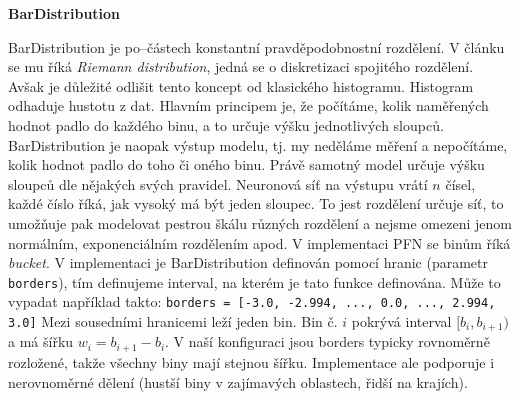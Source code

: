 \textbf{BarDistribution}

BarDistribution je po–částech konstantní pravděpodobnostní rozdělení.
V článku~\cite{muller2022} se mu říká \textit{Riemann distribution}, jedná se o diskretizaci spojitého rozdělení.
Avšak je důležité odlišit tento koncept od klasického histogramu.
Histogram odhaduje hustotu z dat.
Hlavním principem je, že počítáme, kolik naměřených hodnot padlo do každého binu, a to určuje výšku jednotlivých sloupců.
BarDistribution je naopak výstup modelu, tj. my neděláme měření a nepočítáme, kolik hodnot padlo do toho či oného binu.
Právě samotný model určuje výšku sloupců dle nějakých svých pravidel.
Neuronová síť na výstupu vrátí $n$ čísel, každé číslo říká, jak vysoký má být jeden sloupec. 
To jest rozdělení určuje síť, to umožňuje pak modelovat pestrou škálu různých rozdělení a nejsme omezeni jenom normálním, exponenciálním rozdělením apod.
V implementaci PFN se binům říká \textit{bucket}.
V implementaci je BarDistribution definován pomocí hranic (parametr \texttt{borders}), tím definujeme interval, na kterém je tato funkce definována.
Může to vypadat například takto:\newline
\verb|borders = [-3.0, -2.994, ..., 0.0, ..., 2.994, 3.0]| 
Mezi sousedními hranicemi leží jeden bin. 
Bin č. $i$ pokrývá interval $[b_i, b_{i+1})$ a má šířku $w_i = b_{i+1} - b_i$.
V naší konfiguraci jsou borders typicky rovnoměrně rozložené, takže všechny biny mají stejnou šířku. 
Implementace ale podporuje i nerovnoměrné dělení (hustší biny v zajímavých oblastech, řidší na krajích).
\par   

